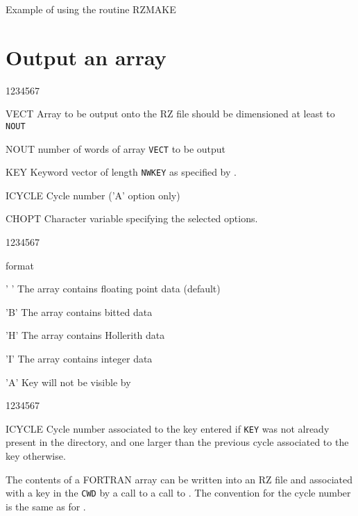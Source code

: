 \begin{XMPt}{Example of using the routine RZMAKE}
\section{Output an array}
\Idesc
\begin{DLtt}{1234567}
\item[VECT]Array to be output onto the RZ file
 should be dimensioned at least to {\tt NOUT}
\item[NOUT]number of words of array {\tt VECT} to be output
\item[KEY]Keyword vector of length {\tt NWKEY} as specified by .
\item[ICYCLE]Cycle number ('A' option only)
\item[CHOPT]Character variable specifying the selected options.
\begin{DLtt}{1234567}
\item[format]
\begin{DLtt}{12}
\item[' ']The array contains floating point data (default)
\item['B']The array contains bitted data
\item['H']The array contains Hollerith data
\item['I']The array contains integer data
\item['A']Key will not be visible by 
\end{DLtt}
\end{DLtt}
\end{DLtt}
\Odesc
\begin{DLtt}{1234567}
\item[ICYCLE]Cycle number associated to the key entered
 if {\tt KEY} was not already present in the directory,
and one larger than the previous cycle associated to the key otherwise.
\end{DLtt}
\par 
The contents of a FORTRAN array can be written
into an RZ file and associated with a key in the {\tt CWD}
by a call to a call to .
The convention for the cycle number is the same as for .

\end{XMPt}
